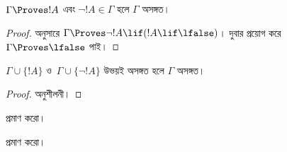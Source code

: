 \documentclass[../../../include/open-logic-section]{subfiles}
\begin{document}
\begin{prop}
  $\Gamma \Proves !A$ এবং $\lnot !A \in \Gamma$ হলে $\Gamma$ অসঙ্গত।
\end{prop}

\begin{proof}
   অনুসারে $\Gamma \Proves \lnot !A \lif (!A
  \lif \lfalse)$।  দুবার প্রয়োগ করে $\Gamma
  \Proves \lfalse$ পাই।
\end{proof}


\begin{prop}
  $\Gamma \cup \{!A\}$ ও~$\Gamma \cup \{\lnot !A\}$ উভয়ই
  অসঙ্গত হলে $\Gamma$ অসঙ্গত।
\end{prop}

\begin{proof}
অনুশীলনী।
\end{proof}

\begin{prob}
   প্রমাণ করো।
\end{prob}
\tagendprob

\begin{prob}
   প্রমাণ করো।
\end{prob}
\tagendprob
\end{document}
